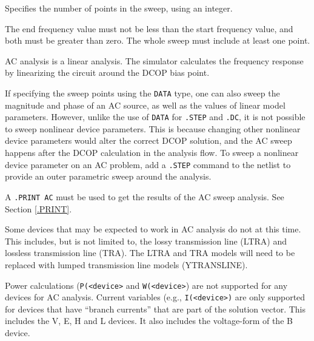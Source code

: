 \begin{Command}
\begin{Arguments}
\begin{description}
\end{description}

Specifies the number of points in the sweep, using an integer.


The end frequency value must not be less than the start frequency value,
and both must be greater than zero. The whole sweep must include at
least one point.

\end{Arguments}

\comments

AC analysis is a linear analysis. The simulator calculates the frequency
response by linearizing the circuit around the DCOP bias point.

If specifying the sweep points using the \texttt{DATA} type, one can also sweep the magnitude and phase of an AC source, as well as the values of linear model parameters.  However, unlike the use of \texttt{DATA} for \texttt{.STEP} and \texttt{.DC}, it is not possible to sweep nonlinear device parameters.  This is because changing other nonlinear device parameters would alter the correct DCOP solution, and the AC sweep happens after the DCOP calculation in the analysis flow.  To sweep a nonlinear device parameter on an AC problem, add a \texttt{.STEP} command to the netlist to provide an outer parametric sweep around the analysis.

A \texttt{.PRINT AC} must be used to get the results of the AC sweep
analysis.  See Section \ref{.PRINT}.

Some devices that may be expected to work in AC analysis do not at this time.  This includes,
but is not limited to, the lossy transmission line (LTRA) and lossless transmission line (TRA).
The LTRA and TRA models will need to be replaced with lumped transmission line models (YTRANSLINE).

Power calculations (\texttt{P(<device>} and \texttt{W(<device>}) are not supported for any
devices for AC analysis.  Current variables (e.g., \texttt{I(<device>)} are only supported for
devices that have ``branch currents'' that are part of the solution vector. This includes
the V, E, H and L devices.  It also includes the voltage-form of the B device.

\end{Command}

